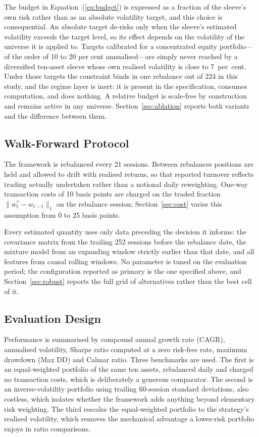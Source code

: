 The budget in Equation~(\ref{eq:budget}) is expressed as a fraction of the sleeve's own
risk rather than as an absolute volatility target, and this choice is consequential.
An absolute target de-risks only when the sleeve's estimated volatility exceeds the
target level, so its effect depends on the volatility of the universe it is applied to.
Targets calibrated for a concentrated equity portfolio---of the order of 10 to 20 per
cent annualised---are simply never reached by a diversified ten-asset sleeve whose own
realised volatility is close to 7~per~cent. Under those targets the constraint binds in
one rebalance out of 224 in this study, and the regime layer is inert: it is present in
the specification, consumes computation, and does nothing. A relative budget is
scale-free by construction and remains active in any universe.
Section~\ref{sec:ablation} reports both variants and the difference between them.

\subsection{Walk-Forward Protocol}

The framework is rebalanced every 21 sessions. Between rebalances positions are held
and allowed to drift with realised returns, so that reported turnover reflects trading
actually undertaken rather than a notional daily reweighting. One-way transaction costs
of 10 basis points are charged on the traded fraction $\|w^{\ast}_t - w_{t-1}\|_1$ on
the rebalance session; Section~\ref{sec:cost} varies this assumption from 0 to 25 basis
points.

Every estimated quantity uses only data preceding the decision it informs: the
covariance matrix from the trailing 252 sessions before the rebalance date, the mixture
model from an expanding window strictly earlier than that date, and all features from
causal rolling windows. No parameter is tuned on the evaluation period; the
configuration reported as primary is the one specified above, and
Section~\ref{sec:robust} reports the full grid of alternatives rather than the best
cell of it.

\subsection{Evaluation Design}

Performance is summarised by compound annual growth rate (CAGR), annualised
volatility, Sharpe ratio computed at a zero risk-free rate, maximum drawdown (Max DD)
and Calmar ratio. Three
benchmarks are used. The first is an equal-weighted portfolio of the same ten assets,
rebalanced daily and charged no transaction costs, which is deliberately a generous
comparator. The second is an inverse-volatility portfolio using trailing 60-session
standard deviations, also costless, which isolates whether the framework adds anything
beyond elementary risk weighting. The third rescales the equal-weighted portfolio to
the strategy's realised volatility, which removes the mechanical advantage a
lower-risk portfolio enjoys in ratio comparisons.

